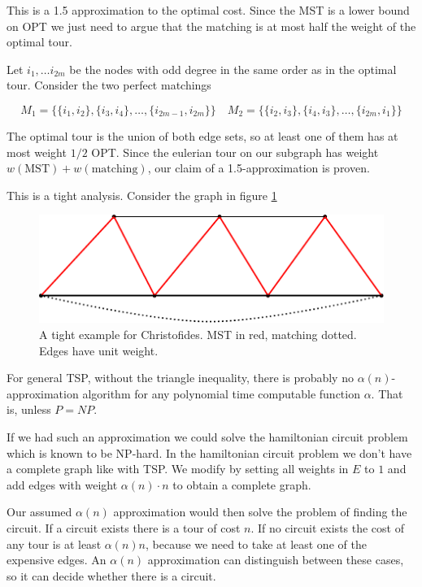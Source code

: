 This is a 1.5 approximation to the optimal cost. Since the MST is a lower bound on OPT we just need to argue that the matching is at most half the weight of the optimal tour.

Let $i_1,\ldots i_{2m}$ be the nodes with odd degree in the same order as in the optimal tour. Consider the two perfect matchings

\[M_1 = \{\{i_1,i_2\},\{i_3,i_4\},\ldots, \{i_{2m-1},i_{2m}\}\} \quad M_2=\{\{i_2,i_3\},\{i_4,i_3\}, \ldots, \{i_{2m},i_1\}\}\]

The optimal tour is the union of both edge sets, so at least one of them has at most weight $1/2$ OPT. Since the eulerian tour on our subgraph has weight $w(\text{MST})+w(\text{matching})$, our claim of a 1.5-approximation is proven.

This is a tight analysis. Consider the graph in figure \ref{Fig:christofidesTight}

\begin{figure}[hbt]
\begin{center}
\includegraphics{./images/christofides}
\end{center}
\caption{A tight example for Christofides. MST in red, matching dotted. Edges have unit weight.}
\label{Fig:christofidesTight}
\end{figure}

For general TSP, without the triangle inequality, there is probably no $\alpha(n)$-approximation algorithm for any polynomial time computable function $\alpha$. That is, unless $P=NP$.

If we had such an approximation we could solve the hamiltonian circuit problem which is known to be NP-hard. In the hamiltonian circuit problem we don't have a complete graph like with TSP. We modify by setting all weights in $E$ to $1$ and add edges with weight $\alpha(n)\cdot n$ to obtain a complete graph.

Our assumed $\alpha(n)$ approximation would then solve the problem of finding the circuit. If a circuit exists there is a tour of cost $n$. If no circuit exists the cost of any tour is at least $\alpha(n)n$, because we need to take at least one of the expensive edges. An $\alpha(n)$ approximation can distinguish between these cases, so it can decide whether there is a circuit.

